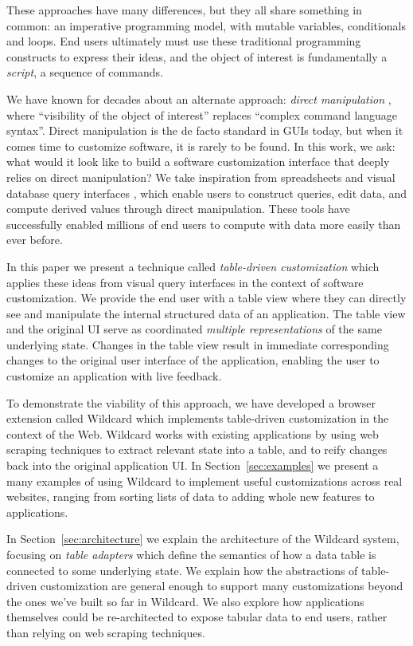 \documentclass[sigplan,10pt,anonymous,review]{acmart}
\begin{document}
These approaches have many differences, but they all share something in
common: an imperative programming model, with mutable variables,
conditionals and loops. End users ultimately must use these traditional
programming constructs to express their ideas, and the object of
interest is fundamentally a \emph{script}, a sequence of commands.

We have known for decades about an alternate approach: \emph{direct
manipulation} \citep{shneiderman1983}, where ``visibility of the object
of interest'' replaces ``complex command language syntax''. Direct
manipulation is the de facto standard in GUIs today, but when it comes
time to customize software, it is rarely to be found. In this work, we
ask: what would it look like to build a software customization interface
that deeply relies on direct manipulation? We take inspiration from
spreadsheets and visual database query interfaces
\citep{2020a, bakke2016}, which enable users to construct queries, edit
data, and compute derived values through direct manipulation. These
tools have successfully enabled millions of end users to compute with
data more easily than ever before.

In this paper we present a technique called \emph{table-driven
customization} which applies these ideas from visual query interfaces in
the context of software customization. We provide the end user with a
table view where they can directly see and manipulate the internal
structured data of an application. The table view and the original UI
serve as coordinated \emph{multiple representations} of the same
underlying state. Changes in the table view result in immediate
corresponding changes to the original user interface of the application,
enabling the user to customize an application with live feedback.

To demonstrate the viability of this approach, we have developed a
browser extension called Wildcard which implements table-driven
customization in the context of the Web. Wildcard works with existing
applications by using web scraping techniques to extract relevant state
into a table, and to reify changes back into the original application
UI. In Section~\ref{sec:examples} we present a many examples of using
Wildcard to implement useful customizations across real websites,
ranging from sorting lists of data to adding whole new features to
applications.

In Section~\ref{sec:architecture} we explain the architecture of the
Wildcard system, focusing on \emph{table adapters} which define the
semantics of how a data table is connected to some underlying state. We
explain how the abstractions of table-driven customization are general
enough to support many customizations beyond the ones we've built so far
in Wildcard. We also explore how applications themselves could be
re-architected to expose tabular data to end users, rather than relying
on web scraping techniques.
\end{document}
